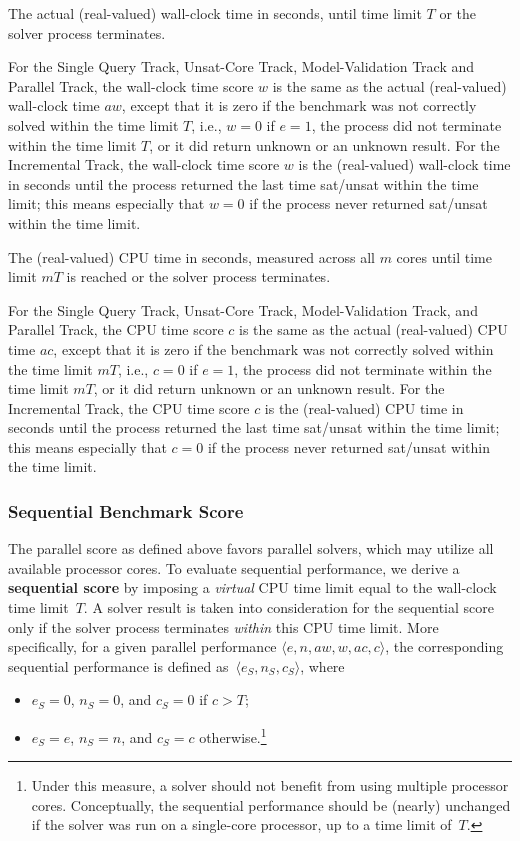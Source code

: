 \documentclass[12pt]{article}
\newcommand{\maintrack}{Single Query Track\xspace}
\newcommand{\inctrack}{Incremental Track\xspace}
\newcommand{\ucoretrack}{Unsat-Core Track\xspace}
\newcommand{\mvaltrack}{Model-Validation Track\xspace}
\newcommand{\paralleltrack}{Parallel Track\xspace}
\begin{document}
The actual (real-valued) wall-clock time in seconds, until time limit $T$ or the
solver process terminates.

For the \maintrack, \ucoretrack, \mvaltrack and \paralleltrack,
the wall-clock time score $w$ is the same as
the actual (real-valued) wall-clock time $\mathit{aw}$,
except that it is zero if the benchmark was not correctly solved within the time limit $T$, i.e.,
$w = 0$ if $e = 1$, the process did not terminate within the time limit $T$, or
it did return unknown or an unknown result.
For the \inctrack, the wall-clock time score $w$
is the (real-valued) wall-clock time in seconds until the process returned the last time sat/unsat within the time limit;
this means especially that $w = 0$ if the process never returned sat/unsat within the time limit.

The (real-valued) CPU time in seconds, measured across all $m$ cores
until time limit $mT$ is reached or the solver process
terminates.

For the \maintrack, \ucoretrack, \mvaltrack, and \paralleltrack,
the CPU time score $c$ is the same as
the actual (real-valued) CPU time $\mathit{ac}$,
except that it is zero if the benchmark was not correctly solved within the time limit $mT$, i.e.,
$c = 0$ if $e = 1$, the process did not terminate within the time limit $mT$, or
it did return unknown or an unknown result.
For the \inctrack, the CPU time score $c$
is the (real-valued) CPU time in seconds until the process returned the last time sat/unsat within the time limit;
this means especially that $c = 0$ if the process never returned sat/unsat within the time limit.

\subsubsection{Sequential Benchmark Score}
\label{sec:sequential}

The parallel score as defined above favors parallel solvers, which may utilize
all available processor cores.  To evaluate sequential performance, we derive a
\textbf{sequential score} by imposing a \emph{virtual} CPU time limit equal to
the wall-clock time limit~$T$.  A solver result is taken into consideration for
the sequential score only if the solver process terminates \emph{within} this
CPU time limit.  More specifically, for a given parallel performance $\langle
e, n, \mathit{aw}, w, \mathit{ac}, c\rangle$, the corresponding sequential performance is defined
as~$\langle e_S, n_S, c_S\rangle$, where
\begin{itemize}
\item $e_S = 0$, $n_S = 0$, and $c_S = 0$ if $c > T$;
\item $e_S = e$, $n_S = n$, and $c_S = c$
  otherwise.\footnote{Under this
  measure, a solver should not benefit from using multiple processor
  cores.  Conceptually, the sequential performance should be (nearly)
  unchanged if the solver was run on a single-core processor, up to a
  time limit of~$T$.}
\end{itemize}
\end{document}
